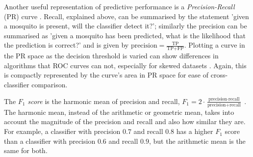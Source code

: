         Another useful representation of predictive performance is a \textit{Precision-Recall} (PR) curve \cite{Raghavan1989}. Recall, explained above, can be summarised by the statement 'given a mosquito is present, will the classifier detect it?'; similarly the precision can be summarised as 'given a mosquito has been predicted, what is the likelihood that the prediction is correct?' and is given by $\text{precision} = \frac{\text{TP}}{\text{TP+FP}}$. Plotting a curve in the PR space as the decision threshold is varied can show differences in algorithms that ROC curves can not, especially for skewed datasets \cite{Davis}. Again, this is compactly represented by the curve's area in PR space for ease of cross-classifier comparison.
        
        The \textit{$F_1$ score} is the harmonic mean of precision and recall, $F_1 = 2\cdot\frac{\text{precision}\cdot \text{recall}}{\text{precision}+\text{recall}}$ . The harmonic mean, instead of the arithmetic or geometric mean, takes into account the magnitude of the precision and recall and also how similar they are. For example, a classifier with precision $0.7$ and recall $0.8$ has a higher $F_1$ score than a classifier with precision $0.6$ and recall $0.9$, but the arithmetic mean is the same for both.
        
        
